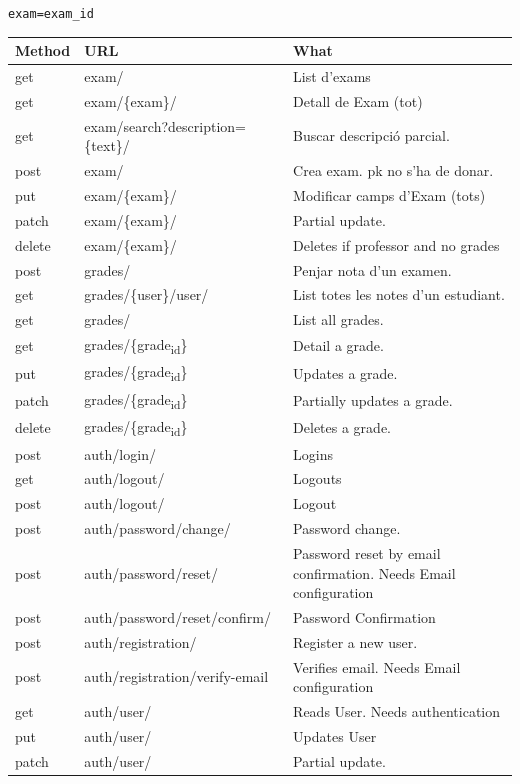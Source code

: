 \documentclass[11pt]{article}
\begin{document}
\texttt{exam=exam\_id}
\begin{table}[htbp]
\label{Methods table. Preceeded by api at ngix level}
\centering
\begin{tabular}{lll}
\hline
Method & URL & What\\
\hline
get & exam/ & List d'exams\\
get & exam/\{exam\}/ & Detall de Exam (tot)\\
get & exam/search?description=\{text\}/ & Buscar descripció parcial.\\
post & exam/ & Crea exam. pk no s'ha de donar.\\
put & exam/\{exam\}/ & Modificar camps d'Exam (tots)\\
patch & exam/\{exam\}/ & Partial update.\\
delete & exam/\{exam\}/ & Deletes if professor and no grades\\
\hline
post & grades/ & Penjar nota d'un examen.\\
get & grades/\{user\}/user/ & List totes les notes d'un estudiant.\\
get & grades/ & List all grades.\\
get & grades/\{grade\textsubscript{id}\} & Detail a grade.\\
put & grades/\{grade\textsubscript{id}\} & Updates a grade.\\
patch & grades/\{grade\textsubscript{id}\} & Partially updates a grade.\\
delete & grades/\{grade\textsubscript{id}\} & Deletes a grade.\\
\hline
post & auth/login/ & Logins\\
get & auth/logout/ & Logouts\\
post & auth/logout/ & Logout\\
post & auth/password/change/ & Password change.\\
post & auth/password/reset/ & Password reset by email confirmation. Needs Email configuration\\
post & auth/password/reset/confirm/ & Password Confirmation\\
post & auth/registration/ & Register a new user.\\
post & auth/registration/verify-email & Verifies email. Needs Email configuration\\
get & auth/user/ & Reads User. Needs authentication\\
put & auth/user/ & Updates User\\
patch & auth/user/ & Partial update.\\
\hline
\end{tabular}
\end{table}
\end{document}
